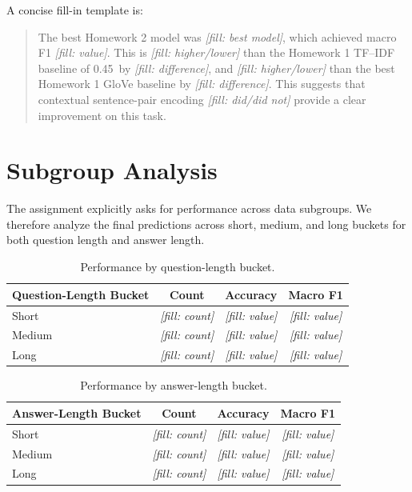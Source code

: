 \documentclass[12pt]{fphw}
\newcommand{\placeholder}[1]{\textit{[fill: #1]}}
\newcommand{\hwonebestf}{0.45}
\begin{document}
A concise fill-in template is:

\begin{quote}
The best Homework 2 model was \placeholder{best model}, which achieved macro F1 \placeholder{value}. This is \placeholder{higher/lower} than the Homework 1 TF--IDF baseline of \hwonebestf\ by \placeholder{difference}, and \placeholder{higher/lower} than the best Homework 1 GloVe baseline by \placeholder{difference}. This suggests that contextual sentence-pair encoding \placeholder{did/did not} provide a clear improvement on this task.
\end{quote}

\section{Subgroup Analysis}

The assignment explicitly asks for performance across data subgroups. We therefore analyze the final predictions across short, medium, and long buckets for both question length and answer length.

\begin{table}[h]
\centering
\small
\begin{tabularx}{\textwidth}{Xccc}
\toprule
Question-Length Bucket & Count & Accuracy & Macro F1 \\
\midrule
Short & \placeholder{count} & \placeholder{value} & \placeholder{value} \\
Medium & \placeholder{count} & \placeholder{value} & \placeholder{value} \\
Long & \placeholder{count} & \placeholder{value} & \placeholder{value} \\
\bottomrule
\end{tabularx}
\caption{Performance by question-length bucket.}
\label{tab:question-subgroups}
\end{table}

\begin{table}[h]
\centering
\small
\begin{tabularx}{\textwidth}{Xccc}
\toprule
Answer-Length Bucket & Count & Accuracy & Macro F1 \\
\midrule
Short & \placeholder{count} & \placeholder{value} & \placeholder{value} \\
Medium & \placeholder{count} & \placeholder{value} & \placeholder{value} \\
Long & \placeholder{count} & \placeholder{value} & \placeholder{value} \\
\bottomrule
\end{tabularx}
\caption{Performance by answer-length bucket.}
\label{tab:answer-subgroups}
\end{table}
\end{document}
